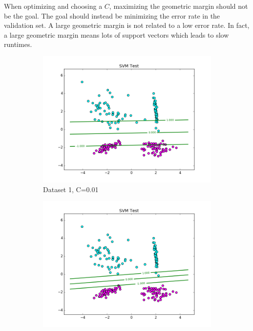 \documentclass[10pt,twoside]{article}
\begin{document}
When optimizing and choosing a $C$, maximizing the geometric margin should not be the goal. The goal should instead be minimizing the error rate in the validation set. A large geometric margin is not related to a low error rate. In fact, a large geometric margin means lots of support vectors which leads to slow runtimes. 

\begin{figure}[h]
        \begin{subfigure}[b]{0.33\textwidth}
                \centering
                \includegraphics[width=\linewidth]{Figures/P2/svm_data1_test_C-2.png}
                \caption{Dataset 1, C=0.01}
        \end{subfigure}%
        \begin{subfigure}[b]{0.33\textwidth}
                \centering
                \includegraphics[width=\linewidth]{Figures/P2/svm_data1_test_C1.png}

\end{subfigure}
\end{figure}
\end{document}
